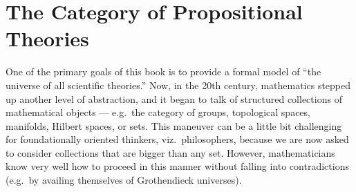 

% 


% 



\chapter{The Category of Propositional Theories} \label{cat-prop}







One of the primary goals of this book is to provide a formal model of
``the universe of all scientific theories.''  Now, in the 20th
century, mathematics stepped up another level of abstraction, and it
began to talk of structured collections of mathematical objects ---
e.g.\ the category of groups, topological spaces, manifolds, Hilbert
spaces, or sets.  This maneuver can be a little bit challenging for
foundationally oriented thinkers, viz.\ philosophers, because we are
now asked to consider collections that are bigger than any set.
However, mathematicians know very well how to proceed in this manner
without falling into contradictions (e.g.\ by availing themselves of
Grothendieck universes).

